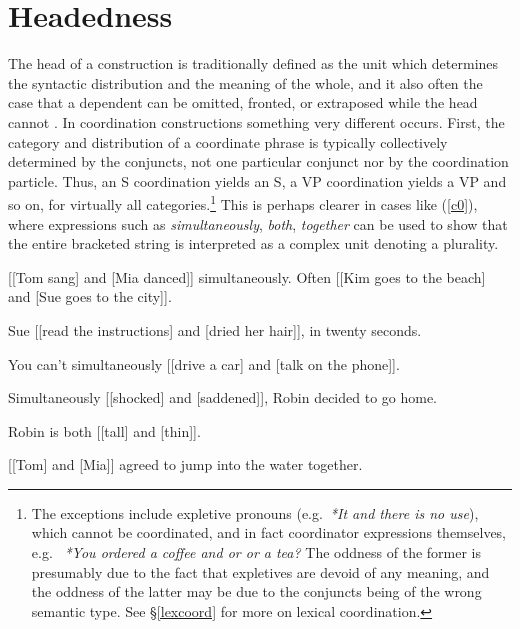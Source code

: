 \documentclass[output=paper
                ,modfonts
                ,nonflat
	        ,collection
	        ,collectionchapter
	        ,collectiontoclongg
 	        ,biblatex
                ,babelshorthands
                ,newtxmath
                ,draftmode
                ,colorlinks, citecolor=brown
]{./langsci/langscibook}
\begin{document}
\section{Headedness}

The head of a construction is traditionally defined as the unit which determines the syntactic distribution and the meaning of the whole, and it also often the case that a dependent can be omitted, fronted, or extraposed while the head cannot \citep{Zwicky85a}.
In coordination constructions something very different occurs. First, the category and distribution of
a coordinate phrase is typically collectively
determined by the conjuncts, not one particular conjunct
nor by the coordination particle.
Thus, an S coordination yields an S, a VP coordination yields a VP and so on, for virtually all categories.\footnote{The exceptions include
expletive pronouns (e.g.\ \emph{*It and there is no use}), which cannot be coordinated, and in fact coordinator expressions themselves, e.g. \ \emph{*You ordered a coffee and or or a tea?} The oddness of the former is presumably due to the fact that expletives are devoid of any meaning, and the oddness of the latter may be due to the conjuncts being of the wrong semantic type. See \S\ref{lexcoord} for more on lexical coordination.}
This is perhaps clearer in cases like (\ref{c0}), where
expressions such as \emph{simultaneously}, \emph{both}, 
\emph{together} can be used to show that the entire bracketed string
is interpreted as a complex unit denoting a plurality.


\begin{exe}
\ex
\begin{xlista}
\ex{} [[Tom sang] and [Mia danced]] simultaneously.
\ex{} Often [[Kim goes to the beach] and [Sue goes to the city]].

\ex{} Sue [[read the instructions] and [dried her hair]], in twenty seconds.

\ex{} You can't simultaneously [[drive a car] and [talk on the phone]].

\ex{} Simultaneously [[shocked] and [saddened]], Robin decided to go home.

\ex Robin is both [[tall] and [thin]].

\ex{} [[Tom] and [Mia]] agreed to jump into the water together.

\end{xlista}\label{c0}
\end{exe}
\end{document}
